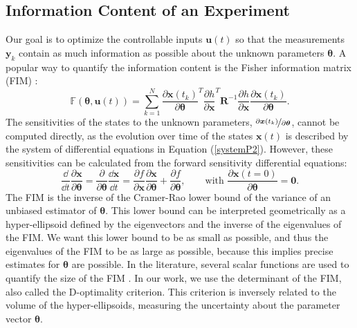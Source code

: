 \subsection{Information Content of an Experiment}
Our goal is to optimize the controllable inputs $\bm u(t)$ so that the measurements $\bm y_k$ contain as much information as possible about the unknown parameters $\bm \theta$. A popular way to quantify the information content is the Fisher information matrix (FIM) \parencite{fedorov, walter}:
\begin{equation}
\mathbb{F}(\bm \theta, \bm u(t))= \sum_{k=1}^N
\frac{\partial \bm x(t_k)}{\partial \bm \theta}^T
\frac{\partial h}{\partial \bm x}^T
\bm R^{-1}
\frac{\partial h}{\partial \bm x}
\frac{\partial \bm x(t_k)}{\partial \bm \theta}.
\label{FIM}
\end{equation}
The sensitivities of the states to the unknown parameters, $\nicefrac{\partial \bm x(t_k)}{\partial \bm \theta}$, cannot be computed directly, as the evolution over time of the states $\bm x(t)$ is described by the system of differential equations in Equation (\ref{systemP2}). However, these sensitivities can be calculated from the forward sensitivity differential equations:
\begin{equation}
\frac{\dd}{\dd t} \frac{\partial \bm x}{\partial \bm \theta}
=  \frac{\partial}{\partial \bm \theta}\frac{\dd \bm x}{\dd t}
= \frac{\partial f}{\partial \bm x}\frac{\partial \bm x}{\partial \bm \theta}
+ \frac{\partial f}{\partial \bm \theta},
\qquad \text{with } \frac{\partial \bm x(t=0)}{\partial \bm \theta} = \bm 0.
\label{sens}
\end{equation}
The FIM is the inverse of the Cramer-Rao lower bound of the variance of an unbiased estimator of $\bm \theta$. This lower bound can be interpreted geometrically as a hyper-ellipsoid defined by the eigenvectors and the inverse of the eigenvalues of the FIM. We want this lower bound to be as small as possible, and thus the eigenvalues of the FIM to be as large as possible, because this implies precise estimates for $\bm \theta$ are possible. In the literature, several scalar functions are used to quantify the size of the FIM \parencite{atkinson}. In our work, we use the determinant of the FIM, also called the D-optimality criterion. This criterion is inversely related to the volume of the hyper-ellipsoids, measuring the uncertainty about the parameter vector $\bm \theta$.
